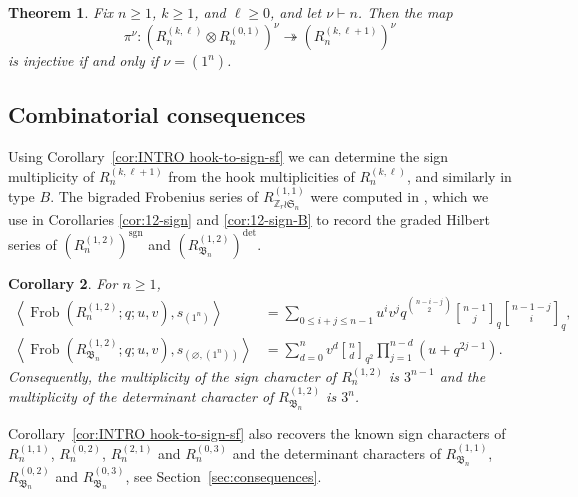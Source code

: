 \documentclass[11pt, reqno]{amsart}
\newtheorem{introthm}{Theorem}
\newtheorem{introcor}[introthm]{Corollary}
\theoremstyle{definition}
\theoremstyle{remark}
\numberwithin{equation}{section}
\newcommand{\0}{\emptyset}
\newcommand{\Z}{\mathbb{Z}}
\renewcommand{\S}{\mathfrak{S}}
\DeclareMathOperator{\Frob}{Frob}
\DeclareMathOperator{\sgn}{sgn}
\DeclareRobustCommand{\qbinom}{\genfrac[]{0pt}{}}
\begin{document}
\begin{introthm}\label{thm:INTRO mezzo-swaddle}
    Fix $n \geq 1$, $k \geq 1$, and $\ell \geq 0$, and let $\nu \vdash n$.
    Then the map
    \[
        \pi^\nu: \left(R_n^{(k,\ell)} \otimes R_n^{(0,1)}\right)^\nu \twoheadrightarrow \left(R_n^{(k,\ell+1)}\right)^\nu
    \]
    is injective if and only if $\nu = (1^n)$.
\end{introthm}

\subsection{Combinatorial consequences}
Using Corollary~\ref{cor:INTRO hook-to-sign-sf} 
we can determine the sign multiplicity of $R_n^{(k,\ell+1)}$ 
from the hook multiplicities of $R_n^{(k,\ell)}$, and similarly in type $B$.
The bigraded Frobenius series of $R_{\Z_r \wr \S_n}^{(1,1)}$ were computed in \cite{BCJLR}, 
which we use in Corollaries \ref{cor:12-sign} and \ref{cor:12-sign-B} 
to record the graded Hilbert series of $\left(R_n^{(1,2)}\right)^{\sgn}$ and $\left(R_{\mathfrak{B}_n}^{(1,2)}\right)^{\det}$. 

\begin{introcor}\label{cor:INTRO 12-sign}
For $n \geq 1$,
    \begin{align*}
        \left\langle \Frob (R_n^{(1,2)}; q; u, v), s_{(1^n)} \right\rangle &= \sum_{0 \leq i+j \leq n-1} u^i v^j q^{\binom{n-i-j}{2}} \qbinom{n-1}{j}_q\qbinom{n-1-j}{i}_q, 
    \\
        \left\langle \Frob (R_{\mathfrak{B}_n}^{(1,2)}; q; u, v), s_{(\varnothing,(1^n))} \right\rangle &= \sum_{d=0}^n v^d \qbinom{n}{d}_{q^2} \prod_{j=1}^{n-d} (u+q^{2j-1}).
    \end{align*}
Consequently, the multiplicity of the sign character of $R_n^{(1,2)}$ is $3^{n-1}$ and the multiplicity of the determinant character of $R_{\mathfrak{B}_n}^{(1,2)}$ is $3^{n}$.
\end{introcor}

Corollary~\ref{cor:INTRO hook-to-sign-sf} also recovers the known sign characters of $R_n^{(1,1)}$, $R_n^{(0,2)}$, $R_n^{(2,1)}$ and $R_n^{(0,3)}$ and the determinant characters of $R_{\mathfrak{B}_n}^{(1,1)}$, $R_{\mathfrak{B}_n}^{(0,2)}$ and $R_{\mathfrak{B}_n}^{(0,3)}$, see Section~\ref{sec:consequences}.
\end{document}
